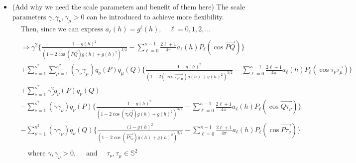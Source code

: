 \documentclass[11pt]{article}
\begin{document}
\begin{itemize}
\item {\color{red} (Add why we need the scale parameters and benefit of them here)} The scale parameters $\gamma, \gamma_{\nu}, \gamma_{\mu} > 0$ can be introduced to achieve more flexibility.\\
\begin{align*}
&\text{Then, since we can express } a_{\ell}(h) = g^{\ell}(h), \quad \ell=0,1,2,\dots\\
\\
&\Rightarrow \gamma^2 \biggl\{ \frac{1 - g(h)^2}{(1-2 \cos{(\overrightarrow{PQ})} g(h) + g(h)^2)^{3/2}} - \sum_{\ell=0}^{\kappa-1} \frac{2\ell+1}{4\pi} a_{\ell}(h) P_{\ell}(\cos{\overrightarrow{PQ}}) \biggl\}\\
&+ \sum_{\nu=1}^{\kappa^2} \sum_{\mu=1}^{\kappa^2} (\gamma_{\nu} \gamma_{\mu}) q_{\nu}(P) q_{\mu}(Q) \biggl\{ \frac{1 - g(h)^2}{(1-2 (\cos{\overrightarrow{\tau_{\nu} \tau_{\mu}}}) g(h) + g(h)^2)^{3/2}} - \sum_{\ell=0}^{\kappa-1} \frac{2\ell+1}{4\pi} a_{\ell}(h) P_{\ell}(\cos{\overrightarrow{\tau_{\nu} \tau_{\mu}}}) \biggl\}\\ 
&+ \sum_{\nu=1}^{\kappa^2} \gamma_\nu^2 q_{\nu}(P) q_{\nu}(Q)\\
&- \sum_{\nu=1}^{\kappa^2} (\gamma \gamma_{\nu}) q_{\nu}(P) \biggl\{ \frac{1 - g(h)^2}{(1-2 \cos{(\overrightarrow{\tau_{\nu} Q})} g(h) + g(h)^2)^{3/2}} - \sum_{\ell=0}^{\kappa-1} \frac{2\ell+1}{4\pi} a_{\ell}(h)  P_{\ell}(\cos{\overrightarrow{Q\tau_{\nu}}}) \biggl\}\\
&- \sum_{\nu=1}^{\kappa^2} (\gamma \gamma_{\nu}) q_{\nu}(Q) \biggl\{\frac{(1 - g(h)^2}{(1-2 \cos{(\overrightarrow{P \tau_{\nu}})} g(h) + g(h)^2)^{3/2}} - \sum_{\ell=0}^{\kappa-1} \frac{2\ell+1}{4\pi} a_{\ell}(h)  P_{\ell}(\cos{\overrightarrow{P\tau_{\nu}}}) \biggl\}\\
\\
&\quad \text{where } \gamma, \gamma_{\nu}>0, \quad \text{ and } \quad \tau_{\nu},  \tau_{\mu} \in \mathbb{S}^2 \\
\end{align*}


\end{itemize}
\end{document}
